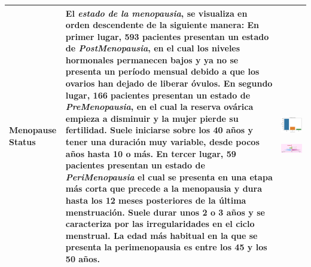 \begin{table}[!htb]
	\footnotesize
	\begin{threeparttable}
		\begin{tabular}{p{2.5cm} p{7cm} p{6.5cm}} \toprule
			Menopause Status
			& El \textit{estado de la menopausia}, se visualiza en orden descendente de la siguiente manera: En primer lugar, 593 pacientes presentan un estado de \textit{PostMenopausia}, en el cual los niveles hormonales permanecen bajos y ya no se presenta un período mensual debido a que los ovarios han dejado de liberar óvulos. En segundo lugar, 166 pacientes presentan un estado de \textit{PreMenopausia}, en el cual la reserva ovárica empieza a disminuir y la mujer pierde su fertilidad. Suele iniciarse sobre los 40 años y tener una duración muy variable, desde pocos años hasta 10 o más. En tercer lugar, 59 pacientes presentan un estado de \textit{PeriMenopausia} el cual se presenta en una etapa más corta que precede a la menopausia y dura hasta los 12 meses posteriores de la última menstruación. Suele durar unos 2 o 3 años y se caracteriza por las irregularidades en el ciclo menstrual. La edad más habitual en la que se presenta la perimenopausia es entre los 45 y los 50 años\cite{ReproAsistidaORG}.
			
			& \begin{center}\includegraphics[width=1\linewidth]{NOTEBOOK/IMAGENES_DESCRIPTIVAS/32_menopause_status}\end{center}
			  \begin{center}\includegraphics[width=1\linewidth]{IMAGENES/menopausia}\end{center}
			\\ \hline
			

\end{tabular}
\end{threeparttable}
\end{table}
